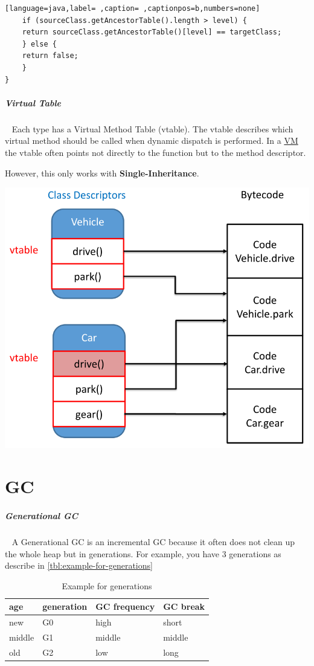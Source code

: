 \documentclass[12pt,twoside,landscape]{extarticle}
\begin{document}
\begin{multicols}{4}
\begin{lstlisting}[language=java,label= ,caption= ,captionpos=b,numbers=none]
    if (sourceClass.getAncestorTable().length > level) {
	return sourceClass.getAncestorTable()[level] == targetClass;
    } else {
	return false;
    }
}
\end{lstlisting}

\subparagraph{Virtual Table} \
\label{sec:org2b7728f}
Each type has a Virtual Method Table (vtable).
The vtable describes which virtual method should be called when dynamic dispatch is performed. 
In a \href{../../../roam/20221230173400-what_is_a_virtual_machine.org}{VM} the vtable often points not directly to the function but to the method descriptor.

However, this only works with \textbf{Single-Inheritance}.

{
\begin{center}
\includegraphics[width=.9\linewidth]{img/vtable_example.png}
\end{center}
\label{fig:vtable-example}
}

\section{GC}
\label{sec:org73c0c86}
\subparagraph{Generational GC} \
\label{sec:org4ee9e5c}
A Generational GC is an incremental GC because it often does not clean up the whole heap but in generations.
For example, you have 3 generations as describe in \autoref{tbl:example-for-generations}

\begin{table}[htbp]
\caption{\label{tbl:example-for-generations}Example for generations}
\centering
\begin{tabular}{llll}
age & generation & GC frequency & GC break\\[0pt]
\hline
new & G0 & high & short\\[0pt]
middle & G1 & middle & middle\\[0pt]
old & G2 & low & long\\[0pt]
\end{tabular}
\end{table}


\end{multicols}
\end{document}
